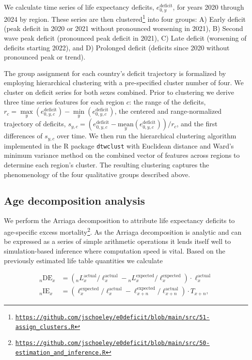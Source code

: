 \documentclass[12pt]{article}
\begin{document}
We calculate time series of life expectancy deficits, $e_{0,y}^\mathrm{deficit}$, for years 2020 through 2024 by region. These series are then clustered\footnote{\href{https://github.com/jschoeley/e0deficit/blob/main/src/51-assign_clusters.R}{\texttt{https://github.com/jschoeley/e0deficit/blob/main/src/51-assign\_clusters.R}}} into four groups: A) Early deficit (peak deficit in 2020 or 2021 without pronounced worsening in 2021), B) Second wave peak deficit (pronounced peak deficit in 2021), C) Late deficit (worsening of deficits starting 2022), and D) Prolonged deficit (deficits since 2020 without pronounced peak or trend). 

The group assignment for each country's deficit trajectory is formalized by employing hierarchical clustering with a pre-specified cluster number of four. We cluster on deficit series for both sexes combined. Prior to clustering we derive three time series features for each region $c$: the range of the deficits, $r_c = \max\limits_y(e_{0,y,c}^\mathrm{deficit}) - \min\limits_y(e_{0,y,c}^\mathrm{deficit})$, the centered and range-normalized trajectory of deficits, $s_{y,c}=\left(e_{0,y,c}^\mathrm{deficit}-\underset{y}{\mathrm{mean}}(e_{0,y,c}^\mathrm{deficit})\right) / r_c$, and the first differences of $s_{y,c}$ over time. We then run the hierarchical clustering algorithm implemented in the R package \texttt{dtwclust} \citep{AlexisSarda-Espinosa2024} with Euclidean distance and Ward's minimum variance method on the combined vector of features across regions to determine each region's cluster. The resulting clustering captures the phenomenology of the four qualitative groups described above.

\subsection{Age decomposition analysis}

We perform the Arriaga decomposition \citep{Arriaga1984} to attribute life expectancy deficits to age-specific excess mortality\footnote{\href{https://github.com/jschoeley/e0deficit/blob/main/src/50-estimation_and_inference.R}{\texttt{https://github.com/jschoeley/e0deficit/blob/main/src/50-estimation\_and\_inference.R}}}. As the Arriaga decomposition is analytic and can be expressed as a series of simple arithmetic operations it lends itself well to simulation-based inference where computation speed is vital. Based on the previously estimated life table quantities we calculate

\begin{align*}
  {}_n\mathrm{DE}_x &= \left({}_nL_{x}^\mathrm{actual} / \ell_{x}^\mathrm{actual} -
  {}_nL_{x}^\mathrm{expected} / \ell_{x}^\mathrm{expected}\right)\cdot \ell_{x}^\mathrm{actual} \\
  {}_n\mathrm{IE}_x &=
    \left(
      \ell_x^\mathrm{expected} / \ell_x^\mathrm{actual} -
      \ell_{x+n}^\mathrm{expected} / \ell_{x+n}^\mathrm{actual}
    \right) \cdot
    T_{x+n},
\end{align*}
\end{document}
